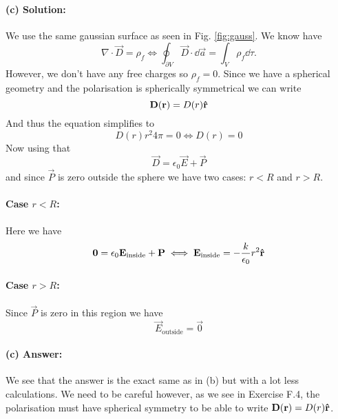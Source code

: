 \paragraph{(c) Solution:}  We use the same gaussian surface as seen in Fig. \ref{fig:gauss}. We know have
\begin{equation}
    \nabla \cdot \vec{D} = \rho_f \iff \oint_{\partial V} \vec{D} \cdot \dd \vec{a} = \int_V \rho_f \dd\tau.
\end{equation}
However, we don't have any free charges so $\rho_f = 0$. Since we have a spherical geometry and the polarisation is spherically symmetrical we can write
\begin{equation}
    \mathbf{D}(\mathbf{r}) = D(r) \mathbf{\hat{r}}
\end{equation}
And thus the equation simplifies to
\begin{equation}
    D(r) r^2 4 \pi = 0 \iff D(r) = 0
\end{equation}
Now using that
\begin{equation}
    \vec{D} = \epsilon_0 \vec{E} + \vec{P}
\end{equation}
and since $\vec{P}$ is zero outside the sphere we have two cases: $r< R$ and $r> R$.
\paragraph{Case $r<R$:} Here we have
\begin{equation}
    \mathbf{0} = \epsilon_0 \mathbf{E}_\text{inside} + \mathbf{P} \iff \mathbf{E}_\text{inside} = -\frac{k}{\epsilon_0} r^2 \mathbf{\hat{r}}
\end{equation}

\paragraph{Case $r > R$:} Since $\vec{P}$ is zero in this region we have
\begin{equation}
    \vec{E}_\text{outside} = \vec{0}
\end{equation}
\paragraph{(c) Answer:} We see that the answer is the exact same as in (b) but with a lot less calculations. We need to be careful however, as we see in Exercise F.4, the polarisation must have spherical symmetry to be able to write $\mathbf{D}(\mathbf{r}) = D(r)\mathbf{\hat{r}}$.